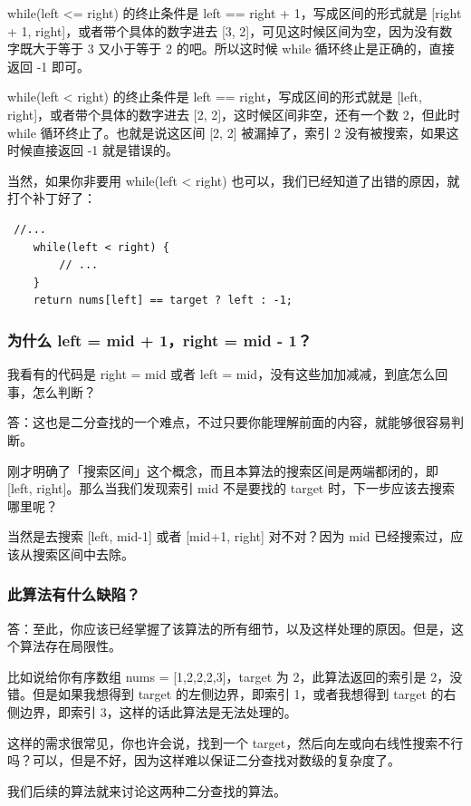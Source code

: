 \documentclass[12pt]{article}
\begin{document}
while(left <= right) 的终止条件是 left == right + 1，写成区间的形式就是 [right + 1, right]，或者带个具体的数字进去 [3, 2]，可见这时候区间为空，因为没有数字既大于等于 3 又小于等于 2 的吧。所以这时候 while 循环终止是正确的，直接返回 -1 即可。

while(left < right) 的终止条件是 left == right，写成区间的形式就是 [left, right]，或者带个具体的数字进去 [2, 2]，这时候区间非空，还有一个数 2，但此时 while 循环终止了。也就是说这区间 [2, 2] 被漏掉了，索引 2 没有被搜索，如果这时候直接返回 -1 就是错误的。

当然，如果你非要用 while(left < right) 也可以，我们已经知道了出错的原因，就打个补丁好了：
\begin{lstlisting}
 //...
    while(left < right) {
        // ...
    }
    return nums[left] == target ? left : -1;
\end{lstlisting}

\subsubsection{为什么 left = mid + 1，right = mid - 1？}
我看有的代码是 right = mid 或者 left = mid，没有这些加加减减，到底怎么回事，怎么判断？

答：这也是二分查找的一个难点，不过只要你能理解前面的内容，就能够很容易判断。

刚才明确了「搜索区间」这个概念，而且本算法的搜索区间是两端都闭的，即 [left, right]。那么当我们发现索引 mid 不是要找的 target 时，下一步应该去搜索哪里呢？

当然是去搜索 [left, mid-1] 或者 [mid+1, right] 对不对？因为 mid 已经搜索过，应该从搜索区间中去除。

\subsubsection{此算法有什么缺陷？}
答：至此，你应该已经掌握了该算法的所有细节，以及这样处理的原因。但是，这个算法存在局限性。

比如说给你有序数组 nums = [1,2,2,2,3]，target 为 2，此算法返回的索引是 2，没错。但是如果我想得到 target 的左侧边界，即索引 1，或者我想得到 target 的右侧边界，即索引 3，这样的话此算法是无法处理的。

这样的需求很常见，你也许会说，找到一个 target，然后向左或向右线性搜索不行吗？可以，但是不好，因为这样难以保证二分查找对数级的复杂度了。

我们后续的算法就来讨论这两种二分查找的算法。
\end{document}
